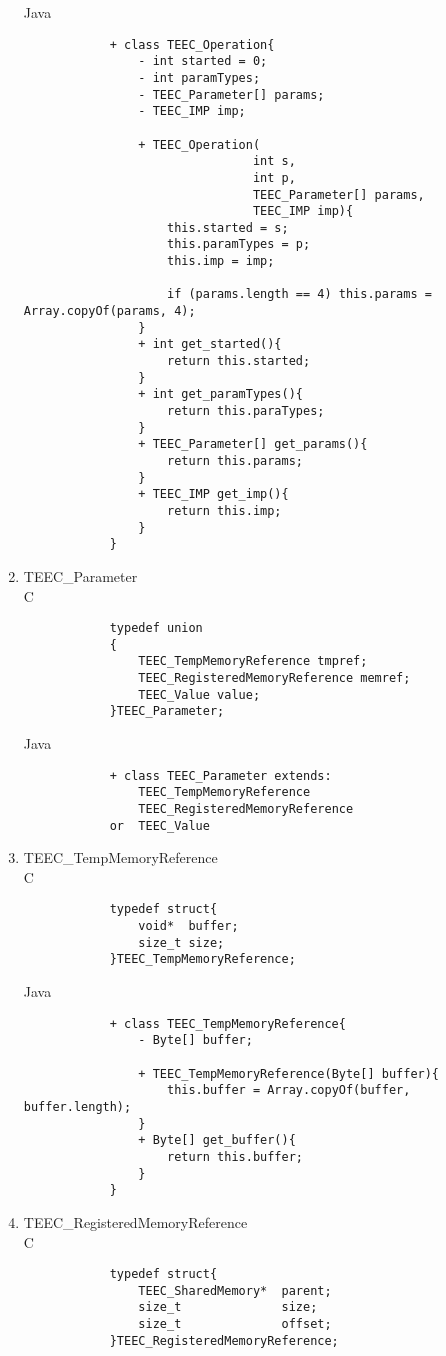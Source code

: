 \documentclass{cseminar}
\begin{document}
\begin{enumerate}
			Java
			\begin{lstlisting}
			+ class TEEC_Operation{
				- int started = 0;
				- int paramTypes;
				- TEEC_Parameter[] params;
				- TEEC_IMP imp;
				
				+ TEEC_Operation(
								int s,
								int p,
								TEEC_Parameter[] params,
								TEEC_IMP imp){
					this.started = s;
					this.paramTypes = p;
					this.imp = imp;
										
					if (params.length == 4) this.params = Array.copyOf(params, 4);				
				}
				+ int get_started(){
					return this.started;				
				}			
				+ int get_paramTypes(){
					return this.paraTypes;				
				}
				+ TEEC_Parameter[] get_params(){
					return this.params;				
				}
				+ TEEC_IMP get_imp(){
					return this.imp;				
				}
			}
			\end{lstlisting}
			
	\item TEEC\_Parameter
			\\C
			\begin{lstlisting}
			typedef union
			{
				TEEC_TempMemoryReference tmpref;
				TEEC_RegisteredMemoryReference memref;
				TEEC_Value value;
			}TEEC_Parameter;
			\end{lstlisting}
			
			Java
			\begin{lstlisting}
			+ class TEEC_Parameter extends:
				TEEC_TempMemoryReference
				TEEC_RegisteredMemoryReference
			or	TEEC_Value	
			\end{lstlisting}
	

	\item TEEC\_TempMemoryReference
			\\C
			\begin{lstlisting}
			typedef struct{
				void*  buffer;
				size_t size;			
			}TEEC_TempMemoryReference;
			\end{lstlisting}
			
			Java
			\begin{lstlisting}
			+ class TEEC_TempMemoryReference{
				- Byte[] buffer;
				
				+ TEEC_TempMemoryReference(Byte[] buffer){
					this.buffer = Array.copyOf(buffer, buffer.length);				
				}
				+ Byte[] get_buffer(){
					return this.buffer;				
				}
			}
			\end{lstlisting}	
	
	\item TEEC\_RegisteredMemoryReference
			\\C
			\begin{lstlisting}
			typedef struct{
				TEEC_SharedMemory*	parent;
				size_t			  	size;
				size_t				offset;
			}TEEC_RegisteredMemoryReference;
			\end{lstlisting}
	

\end{enumerate}
\end{document}
